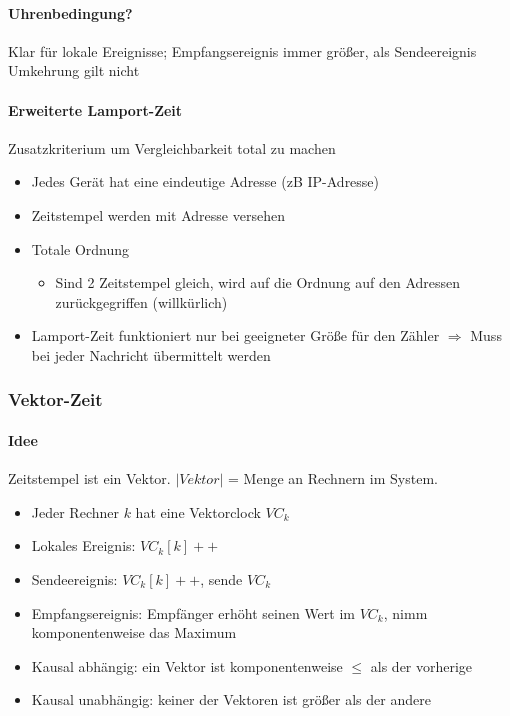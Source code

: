 \documentclass{scrartcl}
\begin{document}
\paragraph{Uhrenbedingung?} Klar für lokale Ereignisse; Empfangsereignis immer größer, als Sendeereignis\\
Umkehrung gilt nicht

\paragraph{Erweiterte Lamport-Zeit} Zusatzkriterium um Vergleichbarkeit total zu machen
\begin{itemize}
\item Jedes Gerät hat eine eindeutige Adresse (zB IP-Adresse)
\item Zeitstempel werden mit Adresse versehen
\item Totale Ordnung
\begin{itemize}
\item Sind 2 Zeitstempel gleich, wird auf die Ordnung auf den Adressen zurückgegriffen (willkürlich) 
\end{itemize}
\item Lamport-Zeit funktioniert nur bei geeigneter Größe für den Zähler $\Rightarrow$ Muss bei jeder Nachricht übermittelt werden
\end{itemize}


\subsubsection{Vektor-Zeit} \label{vekt}
\paragraph{Idee} Zeitstempel ist ein Vektor. $|Vektor|$ = Menge an Rechnern im System.
\begin{itemize}
\item Jeder Rechner $k$ hat eine Vektorclock $VC_k$
\item Lokales Ereignis: $VC_k[k]++$
\item Sendeereignis: $VC_k[k]++$, sende $VC_k$
\item Empfangsereignis: Empfänger erhöht seinen Wert im $VC_k$, nimm komponentenweise das Maximum
\item Kausal abhängig: ein Vektor ist komponentenweise $\leq$ als der vorherige
\item Kausal unabhängig: keiner der Vektoren ist größer als der andere
\end{itemize}
\end{document}
